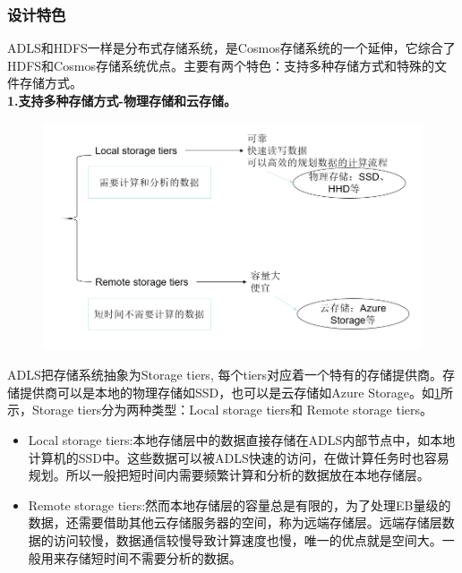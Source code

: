 \documentclass[11pt]{article}
\begin{document}
\subsubsection{设计特色}
ADLS和HDFS一样是分布式存储系统，是Cosmos存储系统的一个延伸，它综合了HDFS和Cosmos存储系统优点。主要有两个特色：支持多种存储方式和特殊的文件存储方式。\\
\textbf{1.支持多种存储方式-物理存储和云存储。}
\begin{figure}[H]
\includegraphics[width=\linewidth]{figs/data_store.png}
\label{fig:data_store}

\end{figure}
ADLS把存储系统抽象为Storage tiers, 每个tiers对应着一个特有的存储提供商。存储提供商可以是本地的物理存储如SSD，也可以是云存储如Azure Storage。如\ref{fig:data_store}所示，Storage tiers分为两种类型：Local storage tiers和 Remote storage tiers。
\begin{itemize}
	\item [] Local storage tiers:本地存储层中的数据直接存储在ADLS内部节点中，如本地计算机的SSD中。这些数据可以被ADLS快速的访问，在做计算任务时也容易规划。所以一般把短时间内需要频繁计算和分析的数据放在本地存储层。
	\item [] Remote storage tiers:然而本地存储层的容量总是有限的，为了处理EB量级的数据，还需要借助其他云存储服务器的空间，称为远端存储层。远端存储层数据的访问较慢，数据通信较慢导致计算速度也慢，唯一的优点就是空间大。一般用来存储短时间不需要分析的数据。
\end{itemize}
\end{document}
